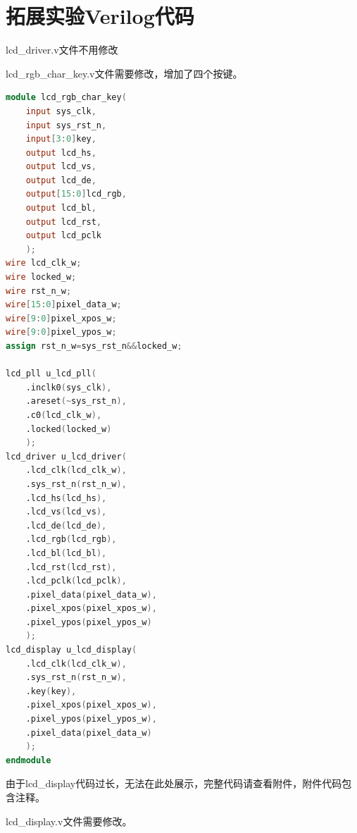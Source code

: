 \documentclass[UTF8]{article}
\theoremstyle{MyLineTheoremStyle} %
\theoremstyle{MyBlockTheoremStyle} %
\theoremstyle{MySubsubsectionStyle} %
\begin{document}
\section{拓展实验Verilog代码}
lcd\_driver.v文件不用修改\par
lcd\_rgb\_char\_key.v文件需要修改，增加了四个按键。\href{run:lcd_rgb_char_key.v}{}\par
\begin{lstlisting}[language=Verilog, caption={lcd\_rgb\_char\_key.v代码修改片段}, label={lst:lcd_rgb_char_key}]
module lcd_rgb_char_key(
	input sys_clk,
	input sys_rst_n,
	input[3:0]key,
	output lcd_hs,
	output lcd_vs,
	output lcd_de,
	output[15:0]lcd_rgb,
	output lcd_bl,
	output lcd_rst,
	output lcd_pclk
	);
wire lcd_clk_w;
wire locked_w;
wire rst_n_w;
wire[15:0]pixel_data_w;
wire[9:0]pixel_xpos_w;
wire[9:0]pixel_ypos_w;
assign rst_n_w=sys_rst_n&&locked_w;

lcd_pll u_lcd_pll(
	.inclk0(sys_clk),
	.areset(~sys_rst_n),
	.c0(lcd_clk_w),
	.locked(locked_w)
	);
lcd_driver u_lcd_driver(
	.lcd_clk(lcd_clk_w),
	.sys_rst_n(rst_n_w),
	.lcd_hs(lcd_hs),
	.lcd_vs(lcd_vs),
	.lcd_de(lcd_de),
	.lcd_rgb(lcd_rgb),
	.lcd_bl(lcd_bl),
	.lcd_rst(lcd_rst),
	.lcd_pclk(lcd_pclk),
	.pixel_data(pixel_data_w),
	.pixel_xpos(pixel_xpos_w),
	.pixel_ypos(pixel_ypos_w)
	);
lcd_display u_lcd_display(
	.lcd_clk(lcd_clk_w),
	.sys_rst_n(rst_n_w),
	.key(key),
	.pixel_xpos(pixel_xpos_w),
	.pixel_ypos(pixel_ypos_w),
	.pixel_data(pixel_data_w)
	);
endmodule
\end{lstlisting}


由于lcd\_display代码过长，无法在此处展示，完整代码请查看附件，附件代码包含注释。\par
lcd\_display.v文件需要修改。\href{run:lcd_display.v}{}\par
\end{document}
